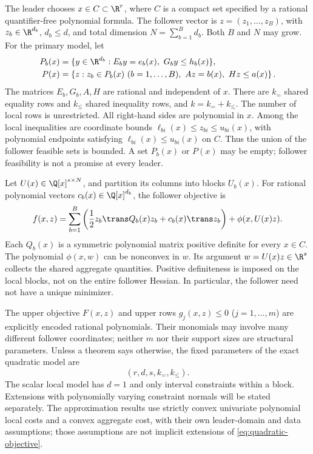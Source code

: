The leader chooses $x\in C\subset\R^r$, where $C$ is a compact set
specified by a rational quantifier-free polynomial formula. The follower
vector is $z=(z_1,\ldots,z_B)$, with $z_b\in\R^{d_b}$,
$d_b\le d$, and total dimension $N=\sum_{b=1}^B d_b$. Both $B$ and $N$
may grow. For the primary model, let
\begin{align}
 P_b(x)&=\{y\in\R^{d_b}:E_b y=e_b(x),\ G_b y\le h_b(x)\},
 \label{eq:local-polytope}\\
 P(x)&=\left\{z:z_b\in P_b(x)\ (b=1,\ldots,B),\
                     Az=b(x),\ Hz\le a(x)\right\}.
 \label{eq:follower-polytope}
\end{align}
The matrices $E_b,G_b,A,H$ are rational and independent of $x$.
There are $k_{=}$ shared equality rows and $k_{\le}$ shared inequality
rows, and $k=k_=+k_{\le}$. The number of local rows is unrestricted.
All right-hand sides are polynomial in $x$. Among the local inequalities
are coordinate bounds
$\ell_{bi}(x)\le z_{bi}\le u_{bi}(x)$, with polynomial endpoints
satisfying $\ell_{bi}(x)\le u_{bi}(x)$ on $C$.
Thus the union of the follower feasible sets is bounded.
A set $P_b(x)$ or $P(x)$ may be empty; follower feasibility is not a
promise at every leader.

Let $U(x)\in\Q[x]^{s\times N}$, and partition its columns into blocks
$U_b(x)$. For rational polynomial vectors $c_b(x)\in\Q[x]^{d_b}$,
the follower objective is
\begin{equation}\label{eq:quadratic-objective}
 f(x,z)=\sum_{b=1}^B\left(\frac12 z_b\trans Q_b(x)z_b+
                c_b(x)\trans z_b\right)+\phi(x,U(x)z).
\end{equation}
Each $Q_b(x)$ is a symmetric polynomial matrix positive definite for
every $x\in C$. The polynomial $\phi(x,w)$ can be nonconvex in $w$.
Its argument $w=U(x)z\in\R^s$ collects the shared aggregate quantities.
Positive definiteness is imposed on the local blocks, not on the entire
follower Hessian. In particular, the follower need not have a unique
minimizer.

The upper objective $F(x,z)$ and upper rows $g_j(x,z)\le0$
($j=1,\ldots,m$) are explicitly encoded rational polynomials.
Their monomials may involve many different follower coordinates; neither
$m$ nor their support sizes are structural parameters. Unless a theorem
says otherwise, the fixed parameters of the exact quadratic model are
\begin{equation}\label{eq:structural-parameters}
                    (r,d,s,k_=,k_{\le}).
\end{equation}
The scalar local model has $d=1$ and only interval constraints within a
block. Extensions with polynomially varying constraint normals will be
stated separately. The approximation results use strictly convex
univariate polynomial local costs and a convex aggregate cost, with their
own leader-domain and data assumptions; those assumptions are not
implicit extensions of \eqref{eq:quadratic-objective}.

